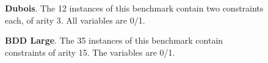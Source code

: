 \newpage

\begin{figure}
  \begin{minipage}[b][10cm][s]{0.45\textwidth}
    \centering
    \vfill
    \begin{tikzpicture}[scale=0.8]
      
    \end{tikzpicture}
    \vfill
    \caption{\textbf{Dubois}. The 12 instances of this benchmark
      contain two constraints each, of arity 3.
      All variables are 0/1.}
    \vspace{\baselineskip}
  \end{minipage}\qquad

\end{figure}

\newpage

\begin{figure}
  \begin{minipage}[b][10cm][s]{0.45\textwidth}
    \centering
    \vfill
    \begin{tikzpicture}[scale=0.8]
      
    \end{tikzpicture}
    \vfill
    \caption{\textbf{BDD Large}.
      The 35 instances of this benchmark contain constraints
      of arity 15. The variables are 0/1.}
    \vspace{\baselineskip}
  \end{minipage}\qquad
\end{figure}
